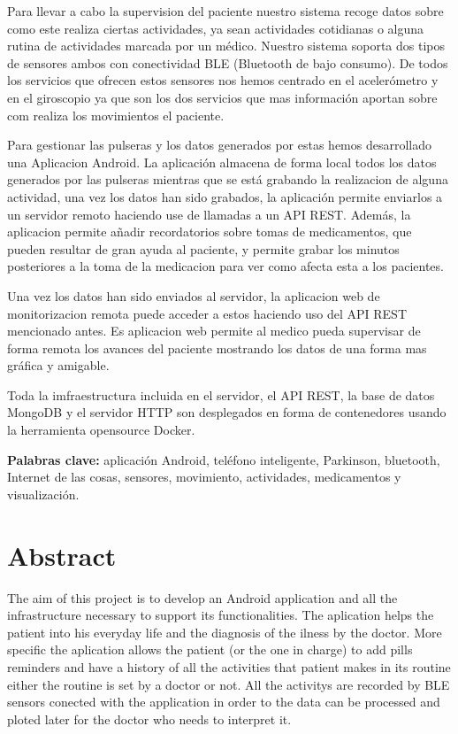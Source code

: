 \documentclass[11pt,spanish]{article}
\newcommand\blankpage{%
    \null
    \thispagestyle{empty}%
    \addtocounter{page}{-1}%
    \newpage}
\begin{document}
Para llevar a cabo la supervision del paciente nuestro sistema recoge datos sobre como este realiza ciertas actividades, ya sean actividades cotidianas o alguna rutina de actividades marcada por un médico. Nuestro sistema soporta dos tipos de sensores ambos con conectividad BLE (Bluetooth de bajo consumo). De todos los servicios que ofrecen estos sensores nos hemos centrado en el acelerómetro y en el giroscopio ya que son los dos servicios que mas información aportan sobre com realiza los movimientos el paciente.
\newline

Para gestionar las pulseras y los datos generados por estas hemos desarrollado una Aplicacion Android. La aplicación almacena de forma local todos los datos generados por las pulseras mientras que se está grabando la realizacion de alguna actividad, una vez los datos han sido grabados, la aplicación permite enviarlos a un servidor remoto haciendo use de llamadas a un API REST. Además, la aplicacion permite añadir recordatorios sobre tomas de medicamentos, que pueden resultar de gran ayuda al paciente, y permite grabar los minutos posteriores a la toma de la medicacion para ver como afecta esta a los pacientes.
\newline

Una vez los datos han sido enviados al servidor, la aplicacion web de monitorizacion remota puede acceder a estos haciendo uso del API REST mencionado antes. Es aplicacion web permite al medico pueda supervisar de forma remota los avances del paciente mostrando los datos de una forma mas gráfica y amigable.
\newline

Toda la imfraestructura incluida en el servidor, el API REST, la base de datos MongoDB y el servidor HTTP son desplegados en forma de contenedores usando la herramienta opensource Docker.
\newline

{\bf Palabras clave:} aplicación Android, teléfono inteligente, Parkinson, bluetooth, Internet de las cosas, sensores, movimiento, actividades, medicamentos y visualización.

\newpage

\blankpage

\section*{Abstract}
The aim of this project is to develop an Android application and all the infrastructure necessary to support its functionalities. The aplication helps the patient into his everyday life and the diagnosis of the ilness by the doctor. More specific the aplication allows the patient (or the one in charge) to add pills reminders and have a history of all the activities that patient makes in its routine either the routine is set by a doctor or not. All the activitys are recorded by BLE sensors conected with the application in order to the data can be processed  and ploted later for the doctor who needs to interpret it.
\newline
\end{document}
